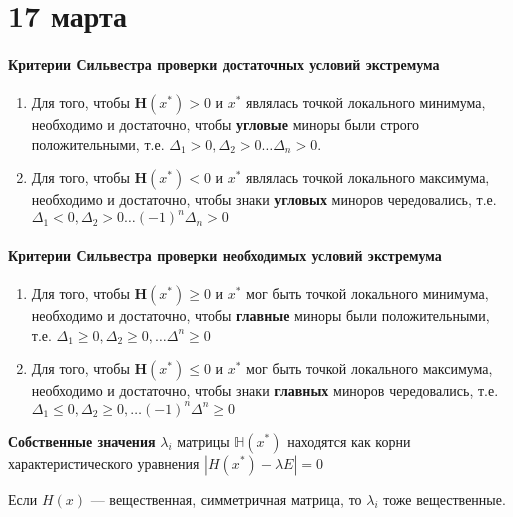 \chapter{17 марта}

\subsubsection{Критерии Сильвестра проверки достаточных условий экстремума}

\begin{enumerate}
    \item Для того, чтобы \(\mathbf H(x^*) > 0\) и \(x^*\) являлась точкой локального минимума, необходимо и достаточно, чтобы \textbf{угловые} миноры были строго положительными, т.е. \(\Delta_1 > 0, \Delta_2 > 0 \dots \Delta_n > 0\).
    \item Для того, чтобы \(\mathbf H(x^*) < 0\) и \(x^*\) являлась точкой локального максимума, необходимо и достаточно, чтобы знаки \textbf{угловых} миноров чередовались, т.е. \(\Delta_1 < 0, \Delta_2 > 0 \dots ( - 1)^n\Delta_n > 0\)
\end{enumerate}

\subsubsection{Критерии Сильвестра проверки необходимых условий экстремума}

\begin{enumerate}
    \item Для того, чтобы \(\mathbf H(x^*) \geq 0\) и \(x^*\) мог быть точкой локального минимума, необходимо и достаточно, чтобы \textbf{главные} миноры были положительными, т.е. \(\Delta_1 \geq 0, \Delta_2 \geq 0, \dots \Delta^n \geq 0\)
    \item Для того, чтобы \(\mathbf H(x^*) \leq 0\) и \(x^*\) мог быть точкой локального максимума, необходимо и достаточно, чтобы знаки \textbf{главных} миноров чередовались, т.е. \(\Delta_1 \leq 0, \Delta_2 \geq 0, \dots ( - 1)^n \Delta^n \geq 0\)
\end{enumerate}

\begin{definition}
    \textbf{Собственные значения} \(\lambda_i\) матрицы \(\mathbb H(x^*)\) находятся как корни характеристического уравнения \(|H(x^*) - \lambda E| = 0\)
\end{definition}

Если \(H(x)\) --- вещественная, симметричная матрица, то \(\lambda_i\) тоже вещественные.

